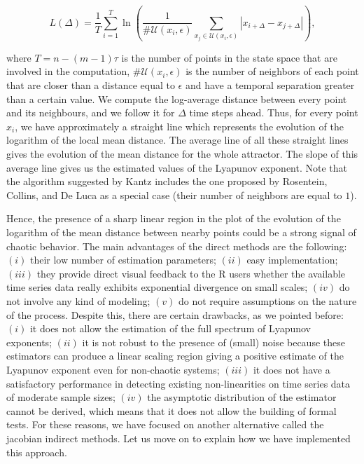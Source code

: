 \begin{equation}
L\left( \Delta  \right) = \frac{1}{T}\sum\limits_{i = 1}^T {\ln \left( {\frac{1}{{\# \mathcal{U}\left( {{x_i},\epsilon } \right)}}\sum\limits_{{x_j} \in \mathcal{U}\left( {{x_i},\epsilon } \right)} {\left| {{x_{i + \Delta }} - {x_{j + \Delta }}} \right|} } \right)}, 
\end{equation}

\noindent where $T = n - \left( {m - 1} \right)\tau$ is the number of points in the state space that are involved in the computation, ${\# \mathcal{U}\left( {{x_i},\epsilon } \right)}$ is the number of neighbors of each point that are closer than a distance equal to $\epsilon$ and have a temporal separation greater than a certain value. We compute the log-average distance between every point and its neighbours, and we follow it for ${\Delta}$ time steps ahead. Thus, for every point ${x_i}$, we have approximately a straight line which represents the evolution of the logarithm of the local mean distance. The average line of all these straight lines gives the evolution of the mean distance for the whole attractor. The slope of this average line gives us the estimated values of the Lyapunov exponent. Note that the algorithm suggested by Kantz includes the one proposed by Rosentein, Collins, and De Luca as a special case (their number of neighbors are equal to $1$).

Hence, the presence of a sharp linear region in the plot of the evolution of the logarithm of the mean distance between nearby points could be a strong signal of chaotic behavior. The main advantages of the direct methods are the following: $\left( i \right)$ their low number of estimation parameters; $\left( ii \right)$ easy implementation; $\left( iii \right)$ they provide direct visual feedback to the R users whether the available time series data really exhibits exponential divergence on small scales; $\left( iv \right)$ do not involve any kind of modeling; $\left( v \right)$ do not require assumptions on the nature of the process. Despite this, there are certain drawbacks, as we pointed before: $\left( i \right)$ it does not allow the estimation of the full spectrum of Lyapunov exponents; $\left( ii \right)$ it is not robust to the presence of (small) noise because these estimators can produce a linear scaling region giving a positive estimate of the Lyapunov exponent even for non-chaotic systems; $\left( iii \right)$ it does not have a satisfactory performance in detecting existing non-linearities on time series data of moderate sample sizes; $\left( iv \right)$ the asymptotic distribution of the estimator cannot be derived, which means that it does not allow the building of formal tests. 
\newpage
\noindent For these reasons, we have focused on another alternative called the jacobian indirect methods. Let us move on to explain how we have implemented this approach.

